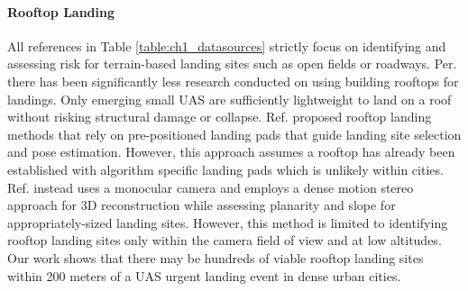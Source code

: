 \paragraph{Rooftop Landing}

All references in Table \ref{table:ch1_datasources} strictly focus on identifying and assessing risk for terrain-based landing sites such as open fields or roadways. Per. \cite{jin_-board_2016} there has been significantly less research conducted on using building rooftops for landings. Only emerging small UAS are sufficiently lightweight to land on a roof without risking structural damage or collapse. Ref. \cite{li_development_2015} proposed rooftop landing methods that rely on pre-positioned landing pads that guide landing site selection and pose estimation. However, this approach assumes a rooftop has already been established with algorithm specific landing pads which is unlikely within cities. Ref. \cite{desaraju_vision-based_2015} instead uses a monocular camera and employs a dense motion stereo approach for 3D reconstruction while assessing planarity and slope for appropriately-sized landing sites. However, this method is limited to identifying rooftop landing sites only within the camera field of view and at low altitudes. Our work shows that there may be hundreds of viable rooftop landing sites within 200 meters of a \ac{UAS} urgent landing event in dense urban cities.







